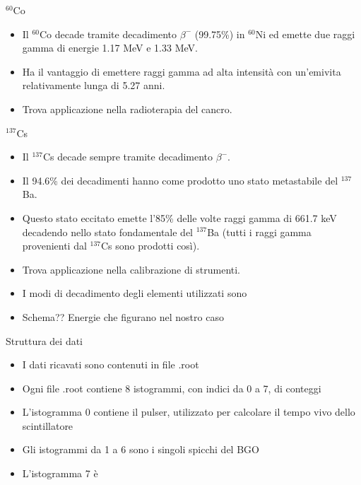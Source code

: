 \documentclass [xcolor=svgnames] {beamer}
\begin{document}
\begin{frame}{$^{60}$Co}
	\begin{itemize}
		\item Il $^{60}$Co decade tramite decadimento $\beta^{-}$ (99.75\%) in $^{60}$Ni ed emette due raggi gamma di energie 1.17 MeV e 1.33 MeV.
		\item Ha il vantaggio di emettere raggi gamma ad alta intensità con un'emivita relativamente lunga di 5.27 anni. 
		\item Trova applicazione nella radioterapia del cancro.
	\end{itemize}
\end{frame}

\begin{frame}{$^{137}$Cs}
	\begin{itemize}
		\item Il $^{137}$Cs decade sempre tramite decadimento $\beta^{-}$.
		\item Il 94.6\% dei decadimenti hanno come prodotto uno stato metastabile del $^{137}$Ba. 
		\item Questo stato eccitato emette l'85\% delle volte raggi gamma di 661.7 keV decadendo nello stato fondamentale del $^{137}$Ba (tutti i raggi gamma provenienti dal $^{137}$Cs sono prodotti così).
		\item Trova applicazione nella calibrazione di strumenti.
	\end{itemize}
\end{frame}

\begin{frame}
	\begin{itemize}
		\item I modi di decadimento degli elementi utilizzati sono
		\item Schema?? Energie che figurano nel nostro caso
	\end{itemize}
\end{frame}

\begin{frame}{Struttura dei dati}
	\begin{itemize}
		\item I dati ricavati sono contenuti in file .root
		\item Ogni file .root contiene 8 istogrammi, con indici da 0 a 7, di conteggi
		\item L'istogramma 0 contiene il pulser, utilizzato per calcolare il tempo vivo dello scintillatore
		\item Gli istogrammi da 1 a 6 sono i singoli spicchi del BGO
		\item L'istogramma 7 è
	\end{itemize}
\end{frame}
\end{document}
